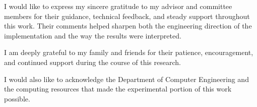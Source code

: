 I would like to express my sincere gratitude to my advisor and committee members for their guidance, technical feedback, and steady support throughout this work. Their comments helped sharpen both the engineering direction of the implementation and the way the results were interpreted.

I am deeply grateful to my family and friends for their patience, encouragement, and continued support during the course of this research.

I would also like to acknowledge the Department of Computer Engineering and the computing resources that made the experimental portion of this work possible.
